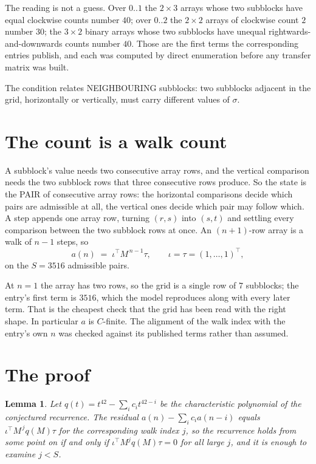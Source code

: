 \documentclass[11pt,a4paper]{article}
\theoremstyle{plain}
\newtheorem{lemma}[theorem]{Lemma}
\theoremstyle{definition}
\begin{document}
The reading is not a guess. Over $0..1$ the $2\times3$ arrays whose two subblocks have equal
clockwise counts number $40$; over $0..2$ the $2\times2$ arrays of clockwise count $2$ number
$30$; the $3\times2$ binary arrays whose two subblocks have unequal rightwards-and-downwards
counts number $40$. Those are the first terms the corresponding entries publish, and each was
computed by direct enumeration before any transfer matrix was built.

The condition relates NEIGHBOURING subblocks: two subblocks adjacent in the grid, horizontally
or vertically, must carry different values of $\sigma$.

\section{The count is a walk count}

A subblock's value needs two consecutive array rows, and the vertical
comparison needs the two subblock rows that three consecutive rows produce. So the state is the
PAIR of consecutive array rows: the horizontal comparisons decide which pairs are admissible at
all, the vertical ones decide which pair may follow which. A step appends one array row,
turning $(r,s)$ into $(s,t)$ and settling every comparison between the two subblock rows at
once. An $(n+1)$-row array is a walk of $n-1$ steps, so
\[
a(n)\;=\;\iota^{\!\top}M^{\,n-1}\tau,\qquad\iota=\tau=(1,\dots,1)^{\!\top},
\]
on the $S=3516$ admissible pairs.

At $n=1$ the array has two rows, so the grid is a single row of $7$
subblocks; the entry's first term is $3516$, which the model
reproduces along with every later term. That is the cheapest check that the grid has been read
with the right shape.
In particular $a$ is $C$-finite. The alignment of the walk index with the entry's own $n$ was
checked against its published terms rather than assumed.

\section{The proof}

\begin{lemma}\label{lem:crit}
Let $q(t)=t^{42}-\sum_i c_it^{42-i}$ be the characteristic polynomial of the
conjectured recurrence. The residual $a(n)-\sum_ic_ia(n-i)$ equals
$\iota^{\!\top}M^{\,j}q(M)\tau$ for the corresponding walk index $j$, so the recurrence
holds from some point on if and only if $\iota^{\!\top}M^{j}q(M)\tau=0$ for all large $j$,
and it is enough to examine $j<S$.
\end{lemma}
\end{document}
